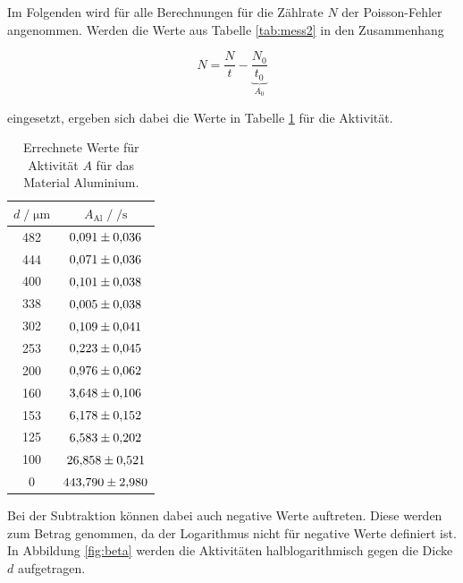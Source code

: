 Im Folgenden wird für alle Berechnungen für die Zählrate $N$ der Poisson-Fehler angenommen.  
Werden die Werte aus Tabelle \ref{tab:mess2} in den Zusammenhang

\begin{equation*}
N = \frac{N}{t}-\underbrace{\frac{N_0}{t_0}}_{A_0}
\end{equation*}

eingesetzt, ergeben sich dabei die 
Werte in Tabelle \ref{tab:akti} für die Aktivität. 

\begin{table}
    \centering
    \caption{Errechnete Werte für Aktivität $A$ für das Material Aluminium.}
    \label{tab:akti}
    \begin{tabular}{c c}
    \toprule
    $ d \;/\; \si{\micro\meter} $ & $A_\text{Al} \;/\; \si{\per\second}$\\
    \midrule 
        482 & $\num{0.091+-0.036}$\\
        444 & $\num{0.071+-0.036}$\\
        400 & $\num{0.101+-0.038}$\\
        338 & $\num{0.005+-0.038}$\\
        302 & $\num{0.109+-0.041}$\\
        253 & $\num{0.223+-0.045}$\\
        200 & $\num{0.976+-0.062}$\\
        160 & $\num{3.648+-0.106}$\\
        153 & $\num{6.178+-0.152}$\\
        125 & $\num{6.583+-0.202}$\\  
        100 & $\num{26.858+-0.521}$\\ 
          0 & $\num{443.79+-2.980}$\\       
    \bottomrule
    \end{tabular}
\end{table}


Bei der Subtraktion können dabei auch negative Werte auftreten. Diese werden zum Betrag genommen, 
da der Logarithmus nicht für negative Werte definiert ist. 
In Abbildung \ref{fig:beta} werden die Aktivitäten halblogarithmisch gegen die Dicke $d$ aufgetragen. 

